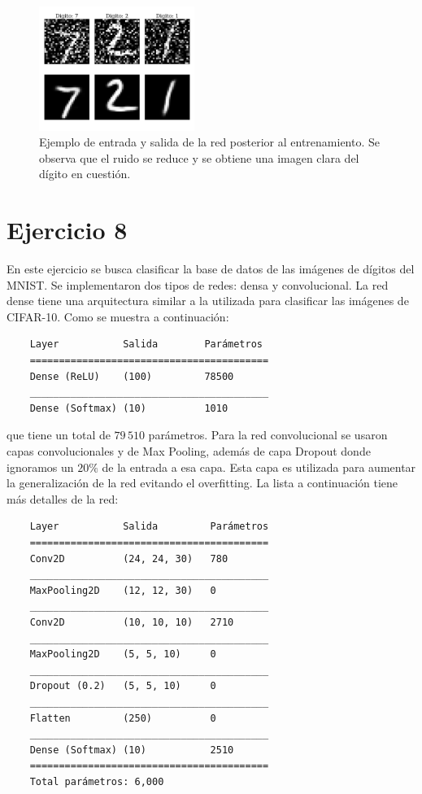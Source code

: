     \begin{figure}[H]
        \begin{small}
            \begin{center}
                \includegraphics[width=0.45\textwidth]{Graphs/ejer7.pdf}
            \end{center}
            \caption{Ejemplo de entrada y salida de la red posterior al entrenamiento. Se observa que el ruido se reduce y se obtiene una imagen clara del dígito en cuestión.}
            \label{fig:ejer7}
        \end{small}
    \end{figure}


\section*{Ejercicio 8}

    En este ejercicio se busca clasificar la base de datos de las imágenes de dígitos del MNIST. Se implementaron dos tipos de redes: densa y convolucional. La red dense tiene una arquitectura similar a la utilizada para clasificar las imágenes de CIFAR-10. Como se muestra a continuación:

    \begin{verbatim}
    Layer           Salida        Parámetros   
    =========================================
    Dense (ReLU)    (100)         78500     
    _________________________________________
    Dense (Softmax) (10)          1010      
    \end{verbatim}
    que tiene un total de  $79\,510$ parámetros. Para la red convolucional se usaron capas convolucionales y  de Max Pooling, además de capa Dropout donde ignoramos un $20\%$ de la entrada a esa capa. Esta capa es utilizada para aumentar la generalización de la red evitando el overfitting. La lista a continuación tiene más detalles de la red:
    \begin{verbatim}
    Layer           Salida         Parámetros
    =========================================
    Conv2D          (24, 24, 30)   780     
    _________________________________________
    MaxPooling2D    (12, 12, 30)   0       
    _________________________________________
    Conv2D          (10, 10, 10)   2710    
    _________________________________________
    MaxPooling2D    (5, 5, 10)     0       
    _________________________________________
    Dropout (0.2)   (5, 5, 10)     0       
    _________________________________________
    Flatten         (250)          0       
    _________________________________________
    Dense (Softmax) (10)           2510    
    =========================================
    Total parámetros: 6,000
    \end{verbatim}

